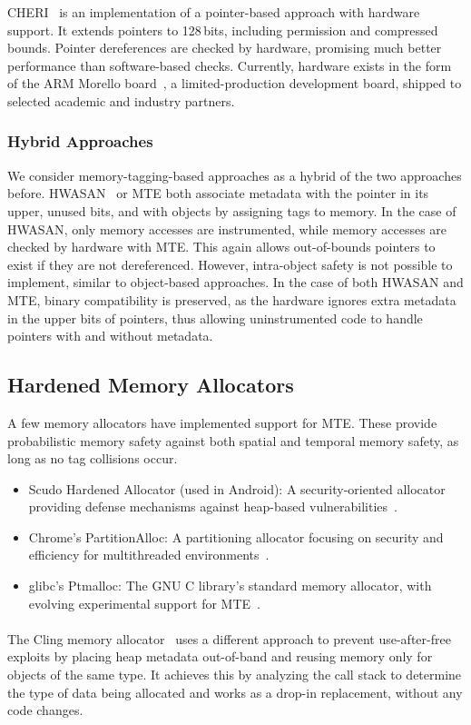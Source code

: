 CHERI~\cite{woodruff2014cheri} is an implementation of a pointer-based approach with hardware support.
It extends pointers to 128\,bits, including permission and compressed bounds.
Pointer dereferences are checked by hardware, promising much better performance than software-based checks.
Currently, hardware exists in the form of the ARM Morello board~\cite{UCAM-CL-TR-982}, a limited-production development board, shipped to selected academic and industry partners.

\subsubsection{Hybrid Approaches}

We consider memory-tagging-based approaches as a hybrid of the two approaches before.
\Ac{HWASAN}~\cite{serebryany2018memory} or \ac{MTE} both associate metadata with the pointer in its upper, unused bits, and with objects by assigning tags to memory.
In the case of \ac{HWASAN}, only memory accesses are instrumented, while memory accesses are checked by hardware with \ac{MTE}.
This again allows out-of-bounds pointers to exist if they are not dereferenced.
However, intra-object safety is not possible to implement, similar to object-based approaches.
In the case of both \ac{HWASAN} and \ac{MTE}, binary compatibility is preserved, as the hardware ignores extra metadata in the upper bits of pointers, thus allowing uninstrumented code to handle pointers with and without metadata.

\subsection{Hardened Memory Allocators}
\label{subsec:hardened-memory-allocators}

A few memory allocators have implemented support for \ac{MTE}.
These provide probabilistic memory safety against both spatial and temporal memory safety, as long as no tag collisions occur.

\begin{itemize}
    \item Scudo Hardened Allocator (used in Android): A security-oriented allocator providing defense mechanisms against heap-based vulnerabilities~\cite{scudo_allocator}.
    \item Chrome's PartitionAlloc: A partitioning allocator focusing on security and efficiency for multithreaded environments~\cite{chrome_partition_alloc}.
    \item glibc's Ptmalloc: The GNU C library's standard memory allocator, with evolving experimental support for \ac{MTE}~\cite{glibc_ptmalloc}.
\end{itemize}

\paragraph{}
The Cling memory allocator~\cite{akritidis2010cling} uses a different approach to prevent use-after-free exploits by placing heap metadata out-of-band and reusing memory only for objects of the same type.
It achieves this by analyzing the call stack to determine the type of data being allocated and works as a drop-in replacement, without any code changes.
